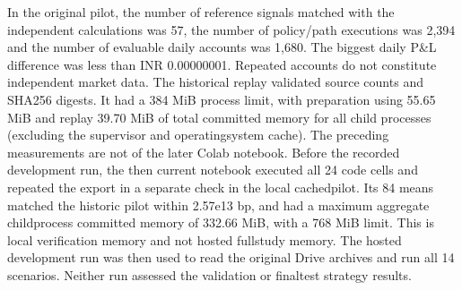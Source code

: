 \documentclass[11pt,a4paper]{article}
\begin{document}
In the original pilot, the number of reference signals matched with the independent calculations was 57, the number of policy/path executions was 2,394 and the number of evaluable daily accounts was 1,680. The biggest daily P\&L difference was less than INR 0.00000001. Repeated accounts do not constitute independent market data. The historical replay validated source counts and SHA\allowbreak{}256 digests. It had a 384 MiB process limit, with preparation using 55.65 MiB and replay 39.70 MiB of total committed memory for all child processes (excluding the supervisor and operating\allowbreak{}system cache). The preceding measurements are not of the later Colab notebook. Before the recorded development run, the then current notebook executed all 24 code cells and repeated the export in a separate check in the local cached\allowbreak{}pilot. Its 84 means matched the historic pilot within 2.57e\allowbreak{}13 bp, and had a maximum aggregate child\allowbreak{}process committed memory of 332.66 MiB, with a 768 MiB limit. This is local verification memory and not hosted full\allowbreak{}study memory. The hosted development run was then used to read the original Drive archives and run all 14 scenarios. Neither run assessed the validation or final\allowbreak{}test strategy results.
\end{document}
